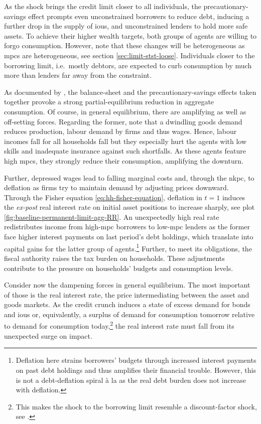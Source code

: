 \documentclass[12pt]{article} %
\numberwithin{equation}{section} %
\numberwithin{figure}{section}
\numberwithin{table}{section}
\begin{document}
As the shock brings the credit limit closer to all individuals, the precautionary-savings effect prompts even unconstrained borrowers to reduce debt, inducing a further drop in the supply of \Gls{iou}s, and unconstrained lenders to hold more safe assets. To achieve their higher wealth targets, both groups of agents are willing to forgo consumption. However, note that these changes will be heterogeneous as \Gls{mpc}s are heterogeneous, see section \ref{sec:limit-stst-loose}. Individuals closer to the borrowing limit, i.e.~mostly debtors, are expected to curb consumption by much more than lenders far away from the constraint.

As documented by \textcite{gl2017}, the balance-sheet and the precautionary-savings effects taken together provoke a strong partial-equilibrium reduction in aggregate consumption. Of course, in general equilibrium, there are amplifying as well as off-setting forces. Regarding the former, note that a dwindling goods demand reduces production, labour demand by firms and thus wages. Hence, labour incomes fall for all households fall but they especially hurt the agents with low skills and inadequate insurance against such shortfalls. As these agents feature high \Gls{mpc}s, they strongly reduce their consumption, amplifying the downturn.

Further, depressed wages lead to falling marginal costs and, through the \Gls{nkpc}, to deflation as firms try to maintain demand by adjusting prices downward. Through the Fisher equation \eqref{eq:hh-fisher-equation}, deflation in $t=1$ induces the \textit{ex-post} real interest rate on initial asset positions to increase sharply, see plot \ref{fig:baseline-permanent-limit-agg-RR}. An unexpectedly high real rate redistributes income from high-\Gls{mpc} borrowers to low-\Gls{mpc} lenders as the former face higher interest payments on last period's debt holdings, which translate into capital gains for the latter group of agents.\footnote{Deflation here strains borrowers' budgets through increased interest payments on past debt holdings and thus amplifies their financial trouble. However, this is not a debt-deflation spiral à la \textcite{fisher1933} as the real debt burden does not increase with deflation.} Further, to meet its obligations, the fiscal authority raises the tax burden on households. These adjustments contribute to the pressure on households' budgets and consumption levels.

Consider now the dampening forces in general equilibrium. The most important of those is the real interest rate, the price intermediating between the asset and goods markets. As the credit crunch induces a state of excess demand for bonds and \Gls{iou}s or, equivalently, a surplus of demand for consumption tomorrow relative to demand for consumption today,\footnote{This makes the shock to the borrowing limit resemble a discount-factor shock, see \textcite{kv2018}.} the real interest rate must fall from its unexpected surge on impact.
\end{document}
